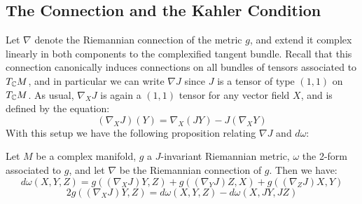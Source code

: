 \subsection{The Connection and the Kahler Condition}

Let $\nabla$ denote the Riemannian connection of the metric $g$, and extend it complex linearly in both components to the complexified tangent bundle.  Recall that this connection canonically induces connections on all bundles of tensors associated to $T_{\mathbb{C}}M$, and in particular we can write $\nabla J$ since $J$ is a tensor of type $(1,1)$ on $T_{\mathbb{C}}M$.  As usual, $\nabla_X J$ is again a $(1,1)$ tensor for any vector field $X$, and is defined by the equation:
%
$$ ( \nabla_X J )(Y) = \nabla_X( JY ) - J( \nabla_X Y ) $$
%
With this setup we have the following proposition relating $\nabla J$ and $d \omega$:
%
\begin{prop} Let $M$ be a complex manifold, $g$ a $J$-invariant Riemannian metric, $\omega$ the 2-form associated to $g$, and let $\nabla$ be the Riemannian connection of $g$.  Then we have:
%
$$ d \omega( X, Y, Z ) = g( (\nabla_X J)Y, Z) + g( (\nabla_Y J)Z, X ) + g( (\nabla_Z J)X, Y ) $$
$$ 2 g( (\nabla_X J)Y, Z ) = d \omega(X, Y, Z) - d \omega(X, JY, JZ) $$
%
\end{prop}
%
